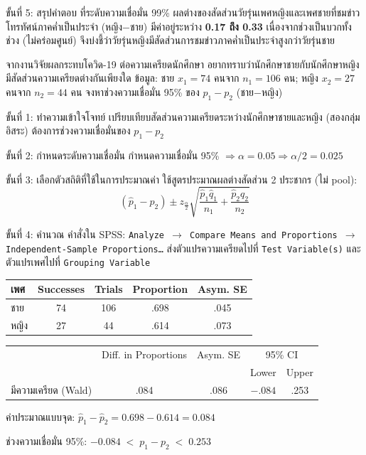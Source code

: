 \documentclass[10pt]{extarticle}
\newcommand{\spssout}[1]{\vspace{2pt}\noindent{\small\textbf{\textcolor{compfr}{Output -- #1}}}\par\vspace{1pt}}
\begin{document}
\begin{stepbox}{ขั้นที่ 5: สรุปคำตอบ}
ที่ระดับความเชื่อมั่น 99\% ผลต่างของสัดส่วนวัยรุ่นเพศหญิงและเพศชายที่ชมข่าวโทรทัศน์ภาคค่ำเป็นประจำ (หญิง$-$ชาย) มีค่าอยู่ระหว่าง \textbf{0.17 ถึง 0.33} เนื่องจากช่วงเป็นบวกทั้งช่วง (ไม่คร่อมศูนย์) จึงบ่งชี้ว่าวัยรุ่นหญิงมีสัดส่วนการชมข่าวภาคค่ำเป็นประจำสูงกว่าวัยรุ่นชาย
\end{stepbox}

\begin{qbox}
จากงานวิจัยผลกระทบโควิด-19 ต่อความเครียดนักศึกษา อยากทราบว่านักศึกษาชายกับนักศึกษาหญิงมีสัดส่วนความเครียดต่างกันเพียงใด ข้อมูล: ชาย $x_1=74$ คนจาก $n_1=106$ คน; หญิง $x_2=27$ คนจาก $n_2=44$ คน จงหาช่วงความเชื่อมั่น 95\% ของ $p_1-p_2$ (ชาย$-$หญิง)
\end{qbox}

\begin{stepbox}{ขั้นที่ 1: ทำความเข้าใจโจทย์}
เปรียบเทียบสัดส่วนความเครียดระหว่างนักศึกษาชายและหญิง (สองกลุ่มอิสระ) ต้องการช่วงความเชื่อมั่นของ $p_1-p_2$
\end{stepbox}

\begin{stepbox}{ขั้นที่ 2: กำหนดระดับความเชื่อมั่น}
กำหนดความเชื่อมั่น 95\% $\Rightarrow \alpha=0.05 \Rightarrow \alpha/2=0.025$
\end{stepbox}

\begin{stepbox}{ขั้นที่ 3: เลือกตัวสถิติที่ใช้ในการประมาณค่า}
ใช้สูตรประมาณผลต่างสัดส่วน 2 ประชากร (ไม่ pool):
$$(\hat p_1-\hat p_2)\pm z_{\frac{\alpha}{2}}\sqrt{\frac{\hat p_1\hat q_1}{n_1}+\frac{\hat p_2\hat q_2}{n_2}}$$
\end{stepbox}

\begin{stepbox}{ขั้นที่ 4: คำนวณ}
คำสั่งใน SPSS: \texttt{Analyze $\to$ Compare Means and Proportions $\to$ Independent-Sample Proportions\dots} ส่งตัวแปรความเครียดไปที่ \texttt{Test Variable(s)} และตัวแปรเพศไปที่ \texttt{Grouping Variable}

\spssout{SPSS จากไฟล์ต้นฉบับ}
\begin{center}\small
\begin{tabular}{@{}lcccc@{}}
\toprule
เพศ & Successes & Trials & Proportion & Asym. SE\\
\midrule
ชาย & 74 & 106 & .698 & .045\\
หญิง & 27 & 44 & .614 & .073\\
\bottomrule
\end{tabular}

\begin{tabular}{@{}lcccc@{}}
\toprule
& Diff. in Proportions & Asym. SE & \multicolumn{2}{c}{95\% CI}\\
& & & Lower & Upper\\
\midrule
มีความเครียด (Wald) & .084 & .086 & $-.084$ & .253\\
\bottomrule
\end{tabular}
\end{center}
ค่าประมาณแบบจุด: $\hat p_1-\hat p_2=0.698-0.614=0.084$

ช่วงความเชื่อมั่น 95\%: $-0.084 \;<\; p_1-p_2 \;<\; 0.253$
\end{stepbox}
\end{document}
